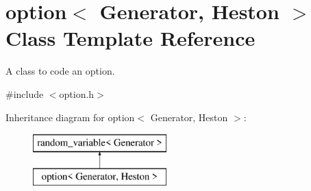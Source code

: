 \hypertarget{classoption}{}\section{option$<$ Generator, Heston $>$ Class Template Reference}
\label{classoption}


A class to code an option.  




{\ttfamily \#include $<$option.\+h$>$}

Inheritance diagram for option$<$ Generator, Heston $>$\+:\begin{figure}[H]
\begin{center}
\leavevmode
\includegraphics[height=2.000000cm]{classoption}
\end{center}
\end{figure}
